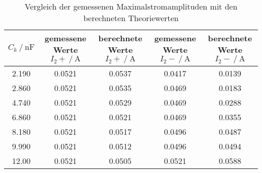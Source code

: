 \begin{table}
  \centering
  \caption{Vergleich der gemessenen Maximalstromamplituden mit den berechneten Theoriewerten}
  \label{tab:theorieamplituden}
  \begin{tabular}{c c c c c}
    \toprule 
    $C_k \:/\: \si{\nano\farad}$ & gemessene Werte $I_2+ \:/\: \si{\ampere}$ & berechnete Werte $I_2+ \:/\: \si{\ampere}$ & gemessene Werte $I_2- \:/\: \si{\ampere}$ & berechnete Werte $I_2- \:/\: \si{\ampere}$    \\ 
    \midrule 
    2.190 & 0.0521 & 0.0537 & 0.0417 & 0.0139 \\
    2.860 & 0.0521 & 0.0535 & 0.0469 & 0.0183 \\
    4.740 & 0.0521 & 0.0529 & 0.0469 & 0.0288 \\
    6.860 & 0.0521 & 0.0521 & 0.0469 & 0.0355 \\
    8.180 & 0.0521 & 0.0517 & 0.0496 & 0.0487 \\
    9.990 & 0.0521 & 0.0512 & 0.0496 & 0.0494 \\
    12.00 & 0.0521 & 0.0505 & 0.0521 & 0.0588 \\
    \bottomrule
  \end{tabular}  
\end{table}


